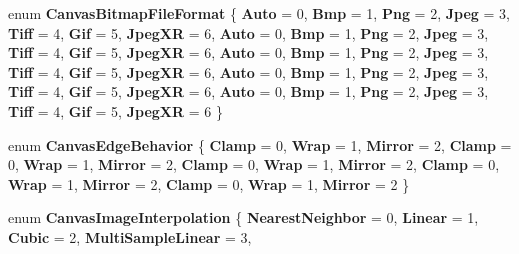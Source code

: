 \begin{DoxyCompactItemize}
enum {\bfseries Canvas\+Bitmap\+File\+Format} \{ \newline
{\bfseries Auto} = 0, 
{\bfseries Bmp} = 1, 
{\bfseries Png} = 2, 
{\bfseries Jpeg} = 3, 
\newline
{\bfseries Tiff} = 4, 
{\bfseries Gif} = 5, 
{\bfseries Jpeg\+XR} = 6, 
{\bfseries Auto} = 0, 
\newline
{\bfseries Bmp} = 1, 
{\bfseries Png} = 2, 
{\bfseries Jpeg} = 3, 
{\bfseries Tiff} = 4, 
\newline
{\bfseries Gif} = 5, 
{\bfseries Jpeg\+XR} = 6, 
{\bfseries Auto} = 0, 
{\bfseries Bmp} = 1, 
\newline
{\bfseries Png} = 2, 
{\bfseries Jpeg} = 3, 
{\bfseries Tiff} = 4, 
{\bfseries Gif} = 5, 
\newline
{\bfseries Jpeg\+XR} = 6, 
{\bfseries Auto} = 0, 
{\bfseries Bmp} = 1, 
{\bfseries Png} = 2, 
\newline
{\bfseries Jpeg} = 3, 
{\bfseries Tiff} = 4, 
{\bfseries Gif} = 5, 
{\bfseries Jpeg\+XR} = 6, 
\newline
{\bfseries Auto} = 0, 
{\bfseries Bmp} = 1, 
{\bfseries Png} = 2, 
{\bfseries Jpeg} = 3, 
\newline
{\bfseries Tiff} = 4, 
{\bfseries Gif} = 5, 
{\bfseries Jpeg\+XR} = 6
 \}
\item 
\mbox{\label{namespace_microsoft_1_1_graphics_1_1_canvas_a0820dd282edd1b22994fc94021da353e}} 
enum {\bfseries Canvas\+Edge\+Behavior} \{ \newline
{\bfseries Clamp} = 0, 
{\bfseries Wrap} = 1, 
{\bfseries Mirror} = 2, 
{\bfseries Clamp} = 0, 
\newline
{\bfseries Wrap} = 1, 
{\bfseries Mirror} = 2, 
{\bfseries Clamp} = 0, 
{\bfseries Wrap} = 1, 
\newline
{\bfseries Mirror} = 2, 
{\bfseries Clamp} = 0, 
{\bfseries Wrap} = 1, 
{\bfseries Mirror} = 2, 
\newline
{\bfseries Clamp} = 0, 
{\bfseries Wrap} = 1, 
{\bfseries Mirror} = 2
 \}
\item 
\mbox{\label{namespace_microsoft_1_1_graphics_1_1_canvas_abc4f24be9a610e40780a91ad57c2e1c3}} 
enum {\bfseries Canvas\+Image\+Interpolation} \{ \newline
{\bfseries Nearest\+Neighbor} = 0, 
{\bfseries Linear} = 1, 
{\bfseries Cubic} = 2, 
{\bfseries Multi\+Sample\+Linear} = 3, 
\newline

\end{DoxyCompactItemize}
